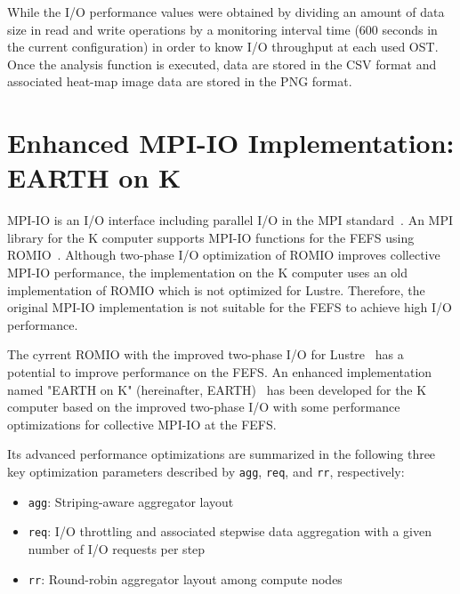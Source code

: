 \documentclass{jhps}
\begin{document}
While the I/O performance values were obtained by dividing an amount of data size
in read and write operations by a monitoring
interval time (600 seconds in the current configuration) in order to know
I/O throughput at each used OST.
Once the analysis function is executed, data are stored in the CSV format
and associated heat-map image data are stored in the PNG format.

\section{Enhanced MPI-IO Implementation: EARTH on K}
\label{sec:EARTH}

MPI-IO is an I/O interface including parallel I/O in the MPI standard~\cite{mpi-forum:web}.
An MPI library for the K computer supports MPI-IO functions for the FEFS
using ROMIO~\cite{thakur:romio}.
Although two-phase I/O optimization of ROMIO improves collective MPI-IO performance,
the implementation on the K computer uses an old implementation of ROMIO
which is not optimized for Lustre.
Therefore, the original MPI-IO implementation is not suitable
for the FEFS to achieve high I/O performance.

The cyrrent ROMIO with the improved two-phase I/O for Lustre~\cite{lustre-adio:whpaper-2008}
has a potential to improve performance on the FEFS.
An enhanced implementation named "EARTH on K"
(hereinafter, EARTH)~\cite{tsujita:WS_EuroMPI2014,tsujita:hpcasia18}
has been developed for the K computer based on the improved two-phase I/O
with some performance optimizations for collective MPI-IO at the FEFS.

Its advanced performance optimizations are summarized in the following
three key optimization parameters described by {\tt agg}, {\tt req}, and {\tt rr}, respectively:
%
\begin{itemize}
\item {\tt agg}: Striping-aware aggregator layout
\item {\tt req}: I/O throttling and associated stepwise data aggregation
with a given number of I/O requests per step
\item {\tt rr}: Round-robin aggregator layout among compute nodes
\end{itemize}
%
\end{document}
